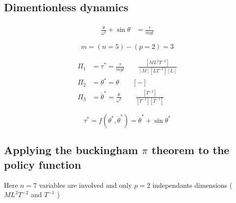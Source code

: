 \subsection{Dimentionless dynamics}


\begin{align}
\frac{\ddot{\theta}}{\omega^2} + \sin \theta &= \frac{\tau}{mgl}
\end{align}

\begin{equation}
m = (n = 5 ) - ( p = 2 ) = 3
\end{equation}

\begin{align}
\Pi_1 &= \tau^* = \frac{\tau}{mgl} \quad \quad \frac{[ML^2T^{-2}]}{[M][LT^{-2}][L]} \\
\Pi_2 &= \theta^* = \theta \quad \quad [-]\\
\Pi_3 &= \ddot{\theta}^* = \frac{ \ddot{\theta}  }{ \omega^2 } \quad \quad \frac{[T^{-2}]}{[T^{-1}][T^{-1}]} 
\end{align}

\begin{equation}
\tau^*
=
f\left(
\theta^*,\ddot{\theta}^*
\right) = \ddot{\theta}^* + \sin \theta^*
\end{equation}

\newpage 
\subsection{Applying the buckingham $\pi$ theorem to the policy function}

Here $n=7$ variables are involved and only $p=2$ independants dimensions ( $ML^2T^{-2}$ and $T^{-1}$ )

